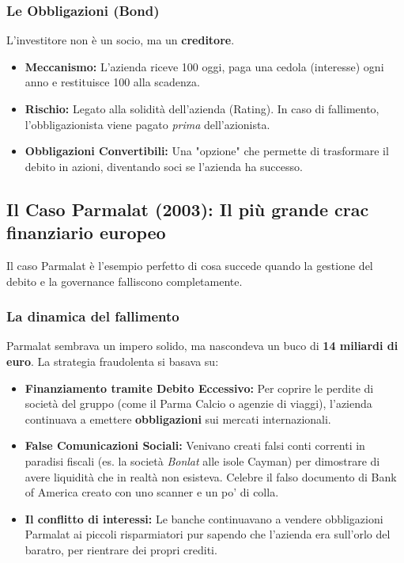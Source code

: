 \documentclass[a4paper,12pt]{article}
\begin{document}
	\subsubsection{Le Obbligazioni (Bond)}
	L'investitore non è un socio, ma un \textbf{creditore}. 
	\begin{itemize}
		\item \textbf{Meccanismo:} L'azienda riceve 100 oggi, paga una cedola (interesse) ogni anno e restituisce 100 alla scadenza.
		\item \textbf{Rischio:} Legato alla solidità dell'azienda (Rating). In caso di fallimento, l'obbligazionista viene pagato \textit{prima} dell'azionista.
		\item \textbf{Obbligazioni Convertibili:} Una "opzione" che permette di trasformare il debito in azioni, diventando soci se l'azienda ha successo.
	\end{itemize}
	
	\subsection{Il Caso Parmalat (2003): Il più grande crac finanziario europeo}
	Il caso Parmalat è l'esempio perfetto di cosa succede quando la gestione del debito e la governance falliscono completamente.
	
	\subsubsection{La dinamica del fallimento}
	Parmalat sembrava un impero solido, ma nascondeva un buco di \textbf{14 miliardi di euro}. La strategia fraudolenta si basava su:
	\begin{itemize}
		\item \textbf{Finanziamento tramite Debito Eccessivo:} Per coprire le perdite di società del gruppo (come il Parma Calcio o agenzie di viaggi), l'azienda continuava a emettere \textbf{obbligazioni} sui mercati internazionali.
		\item \textbf{False Comunicazioni Sociali:} Venivano creati falsi conti correnti in paradisi fiscali (es. la società \textit{Bonlat} alle isole Cayman) per dimostrare di avere liquidità che in realtà non esisteva. Celebre il falso documento di Bank of America creato con uno scanner e un po' di colla.
		\item \textbf{Il conflitto di interessi:} Le banche continuavano a vendere obbligazioni Parmalat ai piccoli risparmiatori pur sapendo che l'azienda era sull'orlo del baratro, per rientrare dei propri crediti.
	\end{itemize}
	
\end{document}
